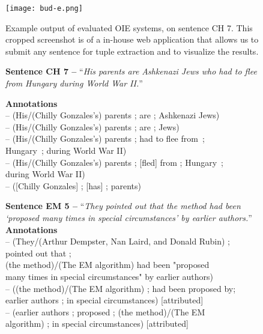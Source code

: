 \pdfoutput=1 \documentclass[11pt, a4paper]{article}
\begin{document}
\begin{figure}[htb]
\centering
  {\texttt{[image: bud-e.png]}}
  \caption{Example output of evaluated OIE systems, on sentence CH 7. This cropped 
    screenshot is of a in-house web application that allows us to submit any
    sentence for tuple extraction and to visualize the results.}
  \label{fig-buddleia}
\end{figure}

\begin{figure}[htb!]
\small
\textbf{Sentence CH 7 --} ``\textit{His parents are Ashkenazi Jews who had to flee from
Hungary during World War II.}''

\smallskip\textbf{Annotations}
\\-- (His/(Chilly Gonzales's) parents ; are ; Ashkenazi Jews)
\\-- (His/(Chilly Gonzales's) parents ; are ; Jews)
\\-- ({His/(Chilly Gonzales's) parents ; had to flee from~;  \\\-\hspace{100pt} Hungary~; during World War II})
\\-- ({His/(Chilly Gonzales's) parents ; [fled] from ; Hungary~; \\\-\hspace{142pt} during World War II})
\\-- ([Chilly Gonzales] ; [has] ; parents)
\\\smallskip\hrulefill

\textbf{Sentence EM 5 --} ``\textit{They pointed out that the method had been `proposed
many times in special circumstances' by earlier authors.}''
\smallskip\\\textbf{Annotations}
\\-- (They/(Arthur Dempster, Nan Laird, and Donald Rubin) ; 
\\\-\hspace{70pt} pointed out that ; 
\\\-\hspace{15pt} (the method)/(The EM algorithm) had been "proposed
\\\-\hspace{15pt} many times in special circumstances" by earlier authors)
\\-- ((the method)/(The EM algorithm) ; had been proposed by;
\\\-\hspace{25pt} earlier authors ; in special circumstances) [attributed]
\\-- (earlier authors ; proposed ; (the method)/(The EM
\\\-\hspace{25pt} algorithm) ; in special circumstances) [attributed{]}
\\\smallskip\hrulefill


\end{figure}
\end{document}
